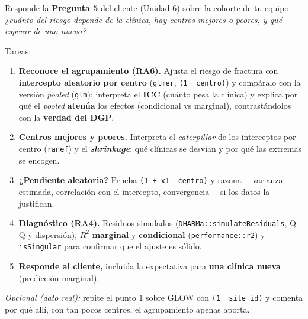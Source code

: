 \documentclass[
  letterpaper,
  DIV=11,
  numbers=noendperiod]{scrartcl}
\providecommand{\tightlist}{%
  \setlength{\itemsep}{0pt}\setlength{\parskip}{0pt}}\usepackage{longtable,booktabs,array}
\begin{document}
\begin{tcolorbox}[enhanced jigsaw, breakable, colframe=quarto-callout-important-color-frame, left=2mm, arc=.35mm, colbacktitle=quarto-callout-important-color!10!white, toprule=.15mm, colback=white, coltitle=black, rightrule=.15mm, opacitybacktitle=0.6, title=\textcolor{quarto-callout-important-color}{\faExclamation}\hspace{0.5em}{Tarea del estudiante (1.4) --- resuelve la Pregunta 5 del caso}, titlerule=0mm, toptitle=1mm, bottomtitle=1mm, leftrule=.75mm, bottomrule=.15mm, opacityback=0]

Responde la \textbf{Pregunta 5} del cliente
(\protect\hyperlink{sec-u16}{Unidad 6}) sobre la cohorte de tu equipo:
\emph{¿cuánto del riesgo depende de la clínica, hay centros mejores o
peores, y qué esperar de uno nuevo?}

Tareas:

\begin{enumerate}
\def\labelenumi{\arabic{enumi}.}
\tightlist
\item
  \textbf{Reconoce el agrupamiento (RA6).} Ajusta el riesgo de fractura
  con \textbf{intercepto aleatorio por centro} (\texttt{glmer},
  \texttt{(1\ \textbar{}\ centro)}) y compáralo con la versión
  \emph{pooled} (\texttt{glm}): interpreta el \textbf{ICC} (cuánto pesa
  la clínica) y explica por qué el \emph{pooled} \textbf{atenúa} los
  efectos (condicional vs marginal), contrastándolos con la
  \textbf{verdad del DGP}.
\item
  \textbf{Centros mejores y peores.} Interpreta el \emph{caterpillar} de
  los interceptos por centro (\texttt{ranef}) y el
  \textbf{\emph{shrinkage}}: qué clínicas se desvían y por qué las
  extremas se encogen.
\item
  \textbf{¿Pendiente aleatoria?} Prueba
  \texttt{(1\ +\ x1\ \textbar{}\ centro)} y razona ---varianza estimada,
  correlación con el intercepto, convergencia--- si los datos la
  justifican.
\item
  \textbf{Diagnóstico (RA4).} Residuos simulados
  (\texttt{DHARMa::simulateResiduals}, Q--Q y dispersión), \(R^2\)
  \textbf{marginal} y \textbf{condicional} (\texttt{performance::r2}) y
  \texttt{isSingular} para confirmar que el ajuste es sólido.
\item
  \textbf{Responde al cliente,} incluida la expectativa para \textbf{una
  clínica nueva} (predicción marginal).
\end{enumerate}

\emph{Opcional (dato real):} repite el punto 1 sobre GLOW con
\texttt{(1\ \textbar{}\ site\_id)} y comenta por qué allí, con tan pocos
centros, el agrupamiento apenas aporta.

\end{tcolorbox}
\end{document}
